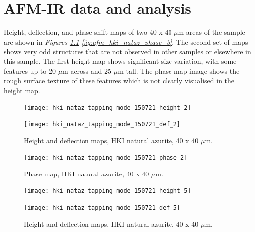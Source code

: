 \chapter{AFM-IR data and analysis} 


Height, deflection, and phase shift maps of two 40 x 40 $\mu$m areas of the sample are shown in \textit{Figures \ref{fig:afm_hki_nataz_height_def_2}}-\textit{\ref{fig:afm_hki_nataz_phase_3}}. The second set of maps shows very odd structures that are not observed in other samples or elsewhere in this sample. The first height map shows significant size variation, with some features up to 20 $\mu$m across and 25 $\mu$m tall. The phase map image shows the rough surface texture of these features which is not clearly visualised in the height map. 

\begin{figure}[H]
\centering
\begin{minipage}{.45\textwidth}
  \centering
  \texttt{[image: hki\_nataz\_tapping\_mode\_150721\_height\_2]}
\end{minipage}
\begin{minipage}{.45\textwidth}
  \centering
  \texttt{[image: hki\_nataz\_tapping\_mode\_150721\_def\_2]}
\end{minipage}
\caption[Height and deflection maps, HKI natural azurite]{Height and deflection maps, HKI natural azurite, 40 x 40 $\mu$m.}
\label{fig:afm_hki_nataz_height_def_2}
\end{figure}

\begin{figure}[H]
\centering
  \texttt{[image: hki\_nataz\_tapping\_mode\_150721\_phase\_2]}
\caption[Phase map, HKI natural azurite]{Phase map, HKI natural azurite, 40 x 40 $\mu$m.}
\label{fig:afm_hki_nataz_phase_2}
\end{figure}

\begin{figure}[H]
\centering
\begin{minipage}{.45\textwidth}
  \centering
  \texttt{[image: hki\_nataz\_tapping\_mode\_150721\_height\_5]}
\end{minipage}
\begin{minipage}{.45\textwidth}
  \centering
  \texttt{[image: hki\_nataz\_tapping\_mode\_150721\_def\_5]}
\end{minipage}
\caption[Height and deflection maps, HKI natural azurite]{Height and deflection maps, HKI natural azurite, 40 x 40 $\mu$m.}
\label{fig:afm_hki_nataz_height_def_3}
\end{figure}


